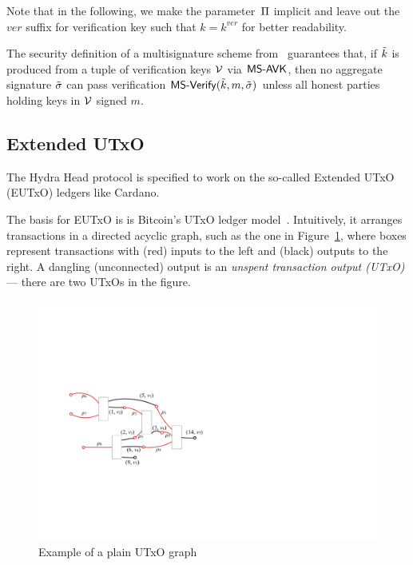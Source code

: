 Note that in the following, we make the parameter~$\Pi$ implicit and leave
out the $ver$ suffix for verification key such that $k = k^{ver}$ for better
readability.

The security definition of a multisignature scheme
from~\cite{itakura1983public,CCS:MicOhtRey01} guarantees that, if $\tilde{k}$ is
produced from a tuple of verification keys $\mathcal{V}$ via $\mathsf{MS\textsf{-}{}AVK}$,
then no aggregate signature $\tilde\sigma$ can pass verification
$\mathsf{MS\textsf{-}{}Verify}(\tilde{k},m,\tilde\sigma)$ unless all honest parties holding keys in
$\mathcal{V}$ signed $m$.

\subsection{Extended UTxO}\label{sec:eutxo}
The Hydra Head protocol is specified to work on the so-called Extended UTxO (EUTxO) ledgers
like Cardano.

The basis for EUTxO is is Bitcoin's UTxO ledger
model~\cite{formal-model-of-bitcoin-transactions,Zahnentferner18-UTxO}.
Intuitively, it arranges transactions in a directed acyclic graph, such as the
one in Figure~\ref{fig:utxo-graph}, where boxes represent transactions with
(red) inputs to the left and (black) outputs to the right. A dangling
(unconnected) output is an \emph{unspent transaction output (UTxO)} --- there
are two UTxOs in the figure.

\begin{figure}[h]
  \centering
 \includegraphics[width=\textwidth/2]{figures/utxo-graph.pdf}
 \caption{Example of a plain UTxO graph}\label{fig:utxo-graph}
\end{figure}

